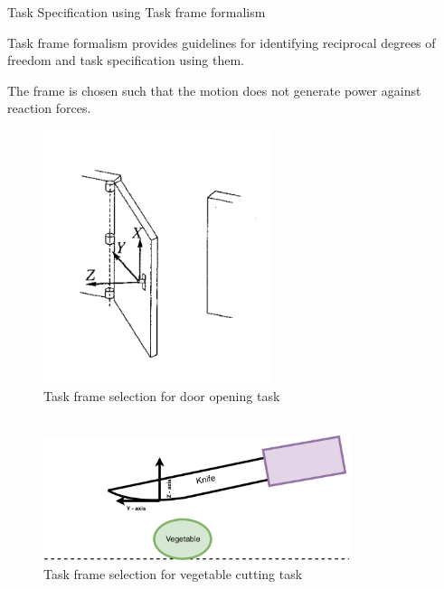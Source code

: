 \documentclass[aspectratio=169]{beamer}
\begin{document}
\begin{frame}{Task Specification using Task frame formalism}
		\vspace{-0.3cm}
		
	Task frame formalism provides guidelines for identifying \alert{reciprocal degrees of freedom} and task specification using them.
	
	\hspace{0.5cm} The frame is chosen such that the motion does not generate power against reaction forces.
		
	\begin{minipage}[b]{0.49\textwidth}
		
		\begin{figure}
			\includegraphics[width=0.6\textwidth]{images/tff_open_doora.png}
			\caption{\scriptsize Task frame selection for door opening task \\ ~}
		\end{figure}
	\end{minipage}
	\hfill
	\begin{minipage}[b]{0.49\textwidth}
		\begin{figure}

			\includegraphics[width=0.8\textwidth]{images/tff_knife}
			\caption{\scriptsize Task frame selection for vegetable cutting task}
		\end{figure}
	\end{minipage}
\end{frame}
\end{document}
